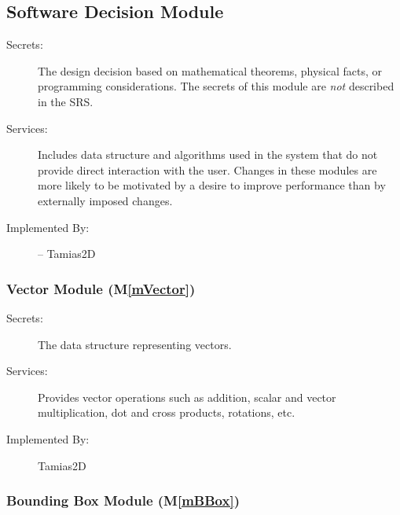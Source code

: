 \documentclass[12pt]{article}
\newcommand{\mref}[1]{M\ref{#1}}
\newcommand{\authornote}[3]{}
\newcommand{\olu}[1]{\authornote{red}{OO}{#1}}
\newcommand{\progname}{Tamias2D}
\begin{document}

\subsection{Software Decision Module}

\begin{description}
\item[Secrets:] The design decision based on mathematical theorems, physical
  facts, or programming considerations. The secrets of this module are
  \emph{not} described in the SRS.
\item[Services:] Includes data structure and algorithms used in the system that do not provide direct interaction with the user. 
  Changes in these modules are more likely to be motivated by a desire to
  improve performance than by externally imposed changes.
\item[Implemented By:] -- {\progname}
\end{description}

\subsubsection{Vector Module (\mref{mVector})}
	
\begin{description}
	\item[Secrets:] The data structure representing vectors.
	\item[Services:] Provides vector operations such as addition, scalar and vector multiplication, dot and cross products, rotations, etc.
	\item[Implemented By:] {\progname}
\end{description}

\subsubsection{Bounding Box Module (\mref{mBBox})}
\end{document}
